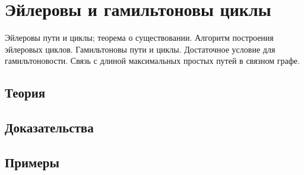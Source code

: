 
\section{Эйлеровы и гамильтоновы циклы}
\label{sec:2.2.09-eulerian-hamiltonian}

\begin{ticket}
Эйлеровы пути и циклы; теорема о существовании. Алгоритм построения эйлеровых циклов. Гамильтоновы пути и циклы. Достаточное условие для гамильтоновости. Связь с длиной максимальных простых путей в связном графе.
\end{ticket}

\subsection*{Теория}

\subsection*{Доказательства}

\subsection*{Примеры}
